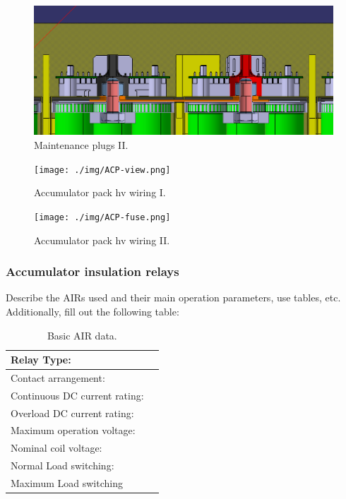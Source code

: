 \begin{figure}[H]
	\centering
	\includegraphics[width=\textwidth]{./img/ACP-nut2.png}
	\caption{Maintenance plugs II.}
	\label{fig:acp-maintance-plug2}
\end{figure}

\begin{figure}[H]
	\centering
	\texttt{[image: ./img/ACP-view.png]}
	\caption{Accumulator pack \gls{hv} wiring I.}
	\label{fig:acp-hv-wiring}
\end{figure}

\begin{figure}[H]
	\centering
	\texttt{[image: ./img/ACP-fuse.png]}
	\caption{Accumulator pack \gls{hv} wiring II.}
	\label{fig:acp-hv-wiring2}
\end{figure}

\subsubsection{Accumulator insulation relays}
Describe the AIRs used and their main operation parameters, use tables, etc.
Additionally, fill out the following table:

\begin{table}[H]
	\centering
	\caption{Basic AIR data.}
	\begin{tabularx}{\textwidth}{|X|X|}
		\hline
		Relay Type: &  \\[\TableSize]
		\hline
		Contact arrangement: &  \\[\TableSize]
		\hline
		Continuous DC current rating: &  \\[\TableSize]
		\hline
		Overload DC current rating:  &  \\[\TableSize]
		\hline
		Maximum operation voltage: &  \\[\TableSize]
		\hline
		Nominal coil voltage: &  \\[\TableSize]
		\hline
		Normal Load switching: & \\[\TableSize]
		\hline
		Maximum Load switching &  \\[\TableSize]
		\hline
	\end{tabularx}%
	\label{tab:acc-air}%
\end{table}%

